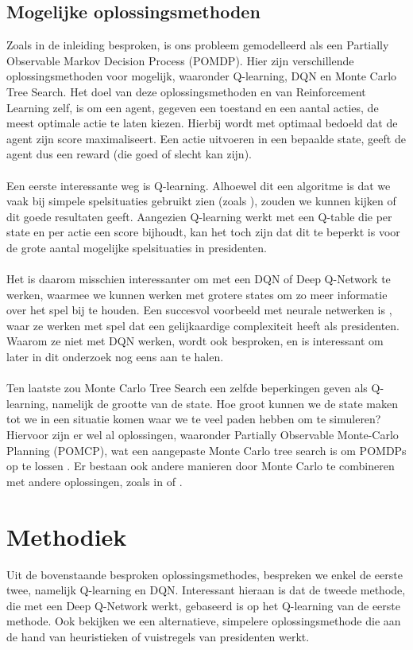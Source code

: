 \documentclass[11pt]{article}
\begin{document}
\subsection{Mogelijke oplossingsmethoden}
Zoals in de inleiding besproken, is ons probleem gemodelleerd als  een Partially Observable Markov Decision Process (POMDP). Hier zijn verschillende oplossingsmethoden voor mogelijk, waaronder Q-learning, DQN en Monte Carlo Tree Search. Het doel van deze oplossingsmethoden en van Reinforcement Learning zelf, is om een agent, gegeven een toestand en een aantal acties, de meest optimale actie te laten kiezen. Hierbij wordt met optimaal bedoeld dat de agent zijn score maximaliseert. Een actie uitvoeren in een bepaalde state, geeft de agent dus een reward (die goed of slecht kan zijn).\\\\ 
Een eerste interessante weg is Q-learning. Alhoewel dit een algoritme is dat we vaak bij simpele spelsituaties gebruikt zien (zoals \cite{simple-qlearning}), zouden we kunnen kijken of dit goede resultaten geeft. Aangezien Q-learning werkt met een Q-table die per state en per actie een score bijhoudt, kan het toch zijn dat dit te beperkt is voor de grote aantal mogelijke spelsituaties in presidenten. \\\\
Het is daarom misschien interessanter om met een DQN of Deep Q-Network te werken, waarmee we kunnen werken met grotere states om zo meer informatie over het spel bij te houden. Een succesvol voorbeeld met neurale netwerken is \cite{nn-paper}, waar ze werken met spel dat een gelijkaardige complexiteit heeft als presidenten. Waarom ze niet met DQN werken, wordt ook besproken, en is interessant om later in dit onderzoek nog eens aan te halen. \\\\
Ten laatste zou Monte Carlo Tree Search een zelfde beperkingen geven als Q-learning, namelijk de grootte van de state. Hoe groot kunnen we de state maken tot we in een situatie komen waar we te veel paden hebben om te simuleren? Hiervoor zijn er wel al oplossingen, waaronder Partially Observable Monte-Carlo Planning (POMCP), wat een aangepaste Monte Carlo tree search is om POMDPs op te lossen \cite{mct-1}. Er bestaan ook andere manieren door Monte Carlo te combineren met andere oplossingen, zoals in \cite{mct-2} of \cite{mct-3}.

\section{Methodiek}
Uit de bovenstaande besproken oplossingsmethodes, bespreken we enkel de eerste twee, namelijk Q-learning en DQN. Interessant hieraan is dat de tweede methode, die met een Deep Q-Network werkt, gebaseerd is op het Q-learning van de eerste methode. Ook bekijken we een alternatieve, simpelere oplossingsmethode die aan de hand van heuristieken of vuistregels van presidenten werkt.
\end{document}
